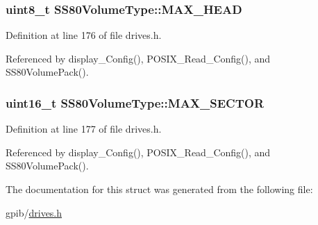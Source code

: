 \subsubsection[{\texorpdfstring{M\+A\+X\+\_\+\+H\+E\+AD}{MAX_HEAD}}]{\setlength{\rightskip}{0pt plus 5cm}uint8\+\_\+t S\+S80\+Volume\+Type\+::\+M\+A\+X\+\_\+\+H\+E\+AD}\hypertarget{structSS80VolumeType_acc2870eb0a52a0e7f4dc57f036d903b1}{}\label{structSS80VolumeType_acc2870eb0a52a0e7f4dc57f036d903b1}


Definition at line 176 of file drives.\+h.



Referenced by display\+\_\+\+Config(), P\+O\+S\+I\+X\+\_\+\+Read\+\_\+\+Config(), and S\+S80\+Volume\+Pack().

\subsubsection[{\texorpdfstring{M\+A\+X\+\_\+\+S\+E\+C\+T\+OR}{MAX_SECTOR}}]{\setlength{\rightskip}{0pt plus 5cm}uint16\+\_\+t S\+S80\+Volume\+Type\+::\+M\+A\+X\+\_\+\+S\+E\+C\+T\+OR}\hypertarget{structSS80VolumeType_a0a367b3bf05801cdee9dadc8324a3bdb}{}\label{structSS80VolumeType_a0a367b3bf05801cdee9dadc8324a3bdb}


Definition at line 177 of file drives.\+h.



Referenced by display\+\_\+\+Config(), P\+O\+S\+I\+X\+\_\+\+Read\+\_\+\+Config(), and S\+S80\+Volume\+Pack().



The documentation for this struct was generated from the following file\+:\begin{DoxyCompactItemize}
\item 
gpib/\hyperlink{drives_8h}{drives.\+h}\end{DoxyCompactItemize}
